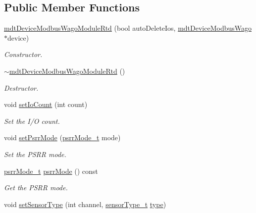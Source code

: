 \subsection*{Public Member Functions}
\begin{DoxyCompactItemize}
\item 
\hyperlink{classmdt_device_modbus_wago_module_rtd_a4d48b7646a6a1da76126f8b32aa6f499}{mdt\-Device\-Modbus\-Wago\-Module\-Rtd} (bool auto\-Delete\-Ios, \hyperlink{classmdt_device_modbus_wago}{mdt\-Device\-Modbus\-Wago} $\ast$device)
\begin{DoxyCompactList}\small\item\em Constructor. \end{DoxyCompactList}\item 
\hyperlink{classmdt_device_modbus_wago_module_rtd_adb24199c383fdefc7ec5359996a838cd}{$\sim$mdt\-Device\-Modbus\-Wago\-Module\-Rtd} ()
\begin{DoxyCompactList}\small\item\em Destructor. \end{DoxyCompactList}\item 
void \hyperlink{classmdt_device_modbus_wago_module_rtd_a2865bb4247e46306ee2279e39a3b5a48}{set\-Io\-Count} (int count)
\begin{DoxyCompactList}\small\item\em Set the I/\-O count. \end{DoxyCompactList}\item 
void \hyperlink{classmdt_device_modbus_wago_module_rtd_a03caaa6473f4237f105596f9b2d35c03}{set\-Psrr\-Mode} (\hyperlink{classmdt_device_modbus_wago_module_rtd_ae235a58228b7c648e7ab89af05ea5037}{psrr\-Mode\-\_\-t} mode)
\begin{DoxyCompactList}\small\item\em Set the P\-S\-R\-R mode. \end{DoxyCompactList}\item 
\hyperlink{classmdt_device_modbus_wago_module_rtd_ae235a58228b7c648e7ab89af05ea5037}{psrr\-Mode\-\_\-t} \hyperlink{classmdt_device_modbus_wago_module_rtd_a6caf3ac10935128b182e558249107302}{psrr\-Mode} () const 
\begin{DoxyCompactList}\small\item\em Get the P\-S\-R\-R mode. \end{DoxyCompactList}\item 
void \hyperlink{classmdt_device_modbus_wago_module_rtd_a91fc8fa26b323ac8a8d3f925df78dbc6}{set\-Sensor\-Type} (int channel, \hyperlink{classmdt_device_modbus_wago_module_rtd_a3ef847ef5be945559be1271e15905fb0}{sensor\-Type\-\_\-t} \hyperlink{classmdt_device_modbus_wago_module_a32a3ee554941240682fb1b166c1217ff}{type})

\end{DoxyCompactItemize}
